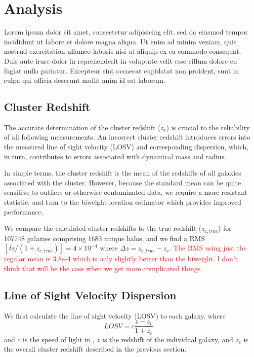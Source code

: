 \documentclass[apj, revtex4]{emulateapj}
\newcommand{\editorial}[1]{\textcolor{red}{#1} }
\begin{document}
\section{Analysis}

Lorem ipsum dolor sit amet, consectetur adipisicing elit, sed do eiusmod tempor incididunt ut labore et dolore magna aliqua. Ut enim ad minim veniam, quis nostrud exercitation ullamco laboris nisi ut aliquip ex ea commodo consequat. Duis aute irure dolor in reprehenderit in voluptate velit esse cillum dolore eu fugiat nulla pariatur. Excepteur sint occaecat cupidatat non proident, sunt in culpa qui officia deserunt mollit anim id est laborum.

\subsection{Cluster Redshift}
The accurate determination of the cluster redshift ($z_c$) is crucial to the reliability of all following measurements. An incorrect cluster redshift introduces errors into the measured line of sight velocity (LOSV) and corresponding dispersion, which, in turn, contributes to errors associated with dynamical mass and radius. 

In simple terms, the cluster redshift is the  mean of the redshifts of all galaxies associated with the cluster. However, because the standard mean can be quite sensitive to outliers or otherwise contaminated data, we require a more resistant statistic, and turn to the biweight location estimator \citep{Beers1990} which provides improved performance. 

We compare the calculated cluster redshifts to the true redshift ($z_{c,true}$) for 107748 galaxies comprising 1683 unique halos, and we find a RMS$[\delta z/(1+z_{c,true})]= 4\times 10^{-4}$ where $\Delta z = z_{c,true} - z_{c}$. \editorial{The RMS using just the regular mean is 3.8e-4 which is only slightly better than the biweight. I don't think that will be the case when we get more complicated things.}

\subsection{Line of Sight Velocity Dispersion}
We first calculate the line of sight velocity (LOSV) to each galaxy, where
\begin{equation}
	LOSV = c\frac{z - z_c}{1+z_c}
\end{equation}
and $c$ is the speed of light in \kms, $z$ is the redshift of the individual galaxy, and $z_c$ is the overall cluster redshift described in the previous section.
\end{document}

